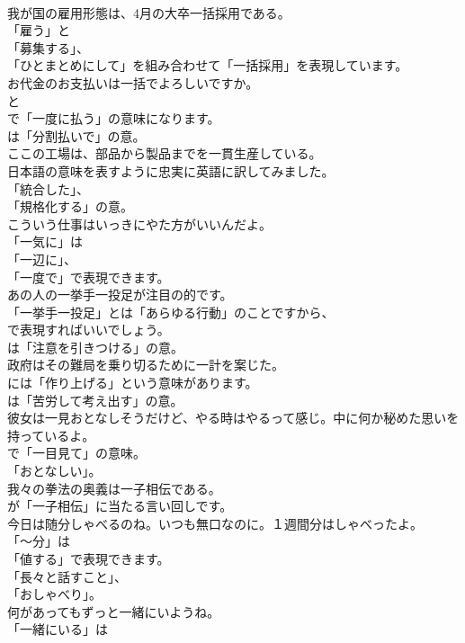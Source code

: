 \documentclass[8pt]{extreport}
\begin{document}
\begin{CJK}{UTF8}{min}
\\	我が国の雇用形態は、4月の大卒一括採用である。 
\\	「雇う」と
\\	「募集する」、
\\	「ひとまとめにして」を組み合わせて「一括採用」を表現しています。	
\\	お代金のお支払いは一括でよろしいですか。 
\\	と
\\	で「一度に払う」の意味になります。
\\	は「分割払いで」の意。	
\\	ここの工場は、部品から製品までを一貫生産している。 
\\	日本語の意味を表すように忠実に英語に訳してみました。
\\	「統合した」、
\\	「規格化する」の意。	
\\	こういう仕事はいっきにやた方がいいんだよ。 
\\	「一気に」は
\\	「一辺に」、
\\	「一度で」で表現できます。	
\\	あの人の一挙手一投足が注目の的です。 
\\	「一挙手一投足」とは「あらゆる行動」のことですから、
\\	で表現すればいいでしょう。
\\	は「注意を引きつける」の意。	
\\	政府はその難局を乗り切るために一計を案じた。 
\\	には「作り上げる」という意味があります。
\\	は「苦労して考え出す」の意。	
\\	彼女は一見おとなしそうだけど、やる時はやるって感じ。中に何か秘めた思いを持っているよ。 
\\	で「一目見て」の意味。
\\	「おとなしい」。	
\\	我々の拳法の奥義は一子相伝である。 
\\	が「一子相伝」に当たる言い回しです。	
\\	今日は随分しゃべるのね。いつも無口なのに。１週間分はしゃべったよ。 
\\	「～分」は
\\	「値する」で表現できます。
\\	「長々と話すこと」、
\\	「おしゃべり」。	
\\	何があってもずっと一緒にいようね。 
\\	「一緒にいる」は 

\end{CJK}
\end{document}
